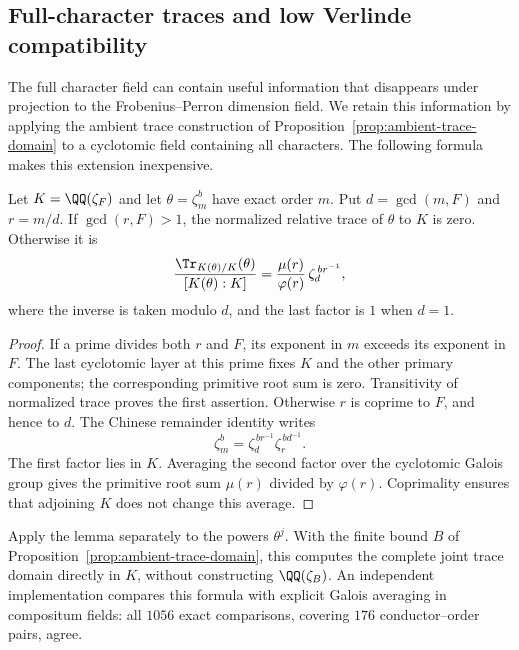 \subsection{Full-character traces and low Verlinde compatibility}
\label{subsec:round3-ambient}
The full character field can contain useful information that disappears
under projection to the Frobenius--Perron dimension field.  We retain this
information by applying the ambient trace construction of
Proposition~\ref{prop:ambient-trace-domain} to a cyclotomic field containing
all characters.  The following formula makes this extension inexpensive.

\begin{lemma}
\label{lem:round3-relative-trace}
Let $K=\QQ(\zeta_F)$ and let $\theta=\zeta_m^b$ have exact order $m$.
Put $d=\gcd(m,F)$ and $r=m/d$.  If $\gcd(r,F)>1$, the normalized relative
trace of $\theta$ to $K$ is zero.  Otherwise it is
\[
 \frac{\Tr_{K(\theta)/K}(\theta)}{[K(\theta):K]}
 =\frac{\mu(r)}{\varphi(r)}\,\zeta_d^{\,b r^{-1}},
\]
where the inverse is taken modulo $d$, and the last factor is $1$ when
$d=1$.
\end{lemma}
\begin{proof}
If a prime divides both $r$ and $F$, its exponent in $m$ exceeds its
exponent in $F$.  The last cyclotomic layer at this prime fixes $K$ and
the other primary components; the corresponding primitive root sum is
zero.  Transitivity of normalized trace proves the first assertion.
Otherwise $r$ is coprime to $F$, and hence to $d$.  The Chinese remainder
identity writes
\[
 \zeta_m^b=\zeta_d^{\,b r^{-1}}\zeta_r^{\,b d^{-1}}.
\]
The first factor lies in $K$.  Averaging the second factor over the
cyclotomic Galois group gives the primitive root sum $\mu(r)$ divided
by $\varphi(r)$.  Coprimality ensures that adjoining $K$ does not change
this average.
\end{proof}

Apply the lemma separately to the powers $\theta^j$.  With the finite
bound $B$ of Proposition~\ref{prop:ambient-trace-domain}, this computes
the complete joint trace domain directly in $K$, without constructing
$\QQ(\zeta_B)$.  An independent implementation compares this formula
with explicit Galois averaging in compositum fields: all $1056$ exact
comparisons, covering $176$ conductor--order pairs, agree.

